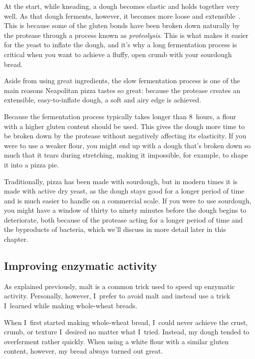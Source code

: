 At the start, while kneading, a dough becomes elastic and holds together very
well. As that dough ferments, however, it becomes more loose and
extensible~\cite{protease+enzyme+bread}. This is because some of the gluten
bonds have
been broken down naturally by the protease through a process known as
\emph{proteolysis}. This is what makes it easier for the yeast to inflate the
dough, and it's why a long fermentation process is critical when you want to
achieve a fluffy, open crumb with your sourdough bread.

Aside from using great ingredients, the slow fermentation process is one of the
main reasons Neapolitan pizza tastes so great: because the protease creates an
extensible, easy-to-inflate dough, a soft and airy edge is achieved.

Because the fermentation process typically takes longer than 8~hours, a
flour with a higher gluten content should be used. This gives the dough more
time to be broken down by the protease without negatively affecting its
elasticity. If you were to use a weaker flour, you might end up with a dough
that's broken down so much that it tears during stretching, making it
impossible, for example, to shape it into a pizza pie.

Traditionally, pizza has been made with sourdough, but in modern times it is
made with active dry yeast, as the dough stays good for a longer period of time
and is much easier to handle on a commercial scale. If you were to use
sourdough, you might have a window of thirty to ninety minutes before the dough
begins to deteriorate, both because of the protease acting for a longer period
of time and the byproducts of bacteria, which we'll discuss in more detail later
in this chapter.

\subsection{Improving enzymatic activity}

As explained previously, malt is a common trick used to speed up enzymatic
activity. Personally, however, I~prefer to avoid malt and instead use a
trick I~learned while making whole-wheat breads.

When I~first started making whole-wheat bread, I~could never achieve the
crust, crumb, or texture I~desired no matter what I~tried. Instead, my dough
tended to overferment rather quickly. When using a white flour with a similar
gluten content, however, my bread always turned out great.

